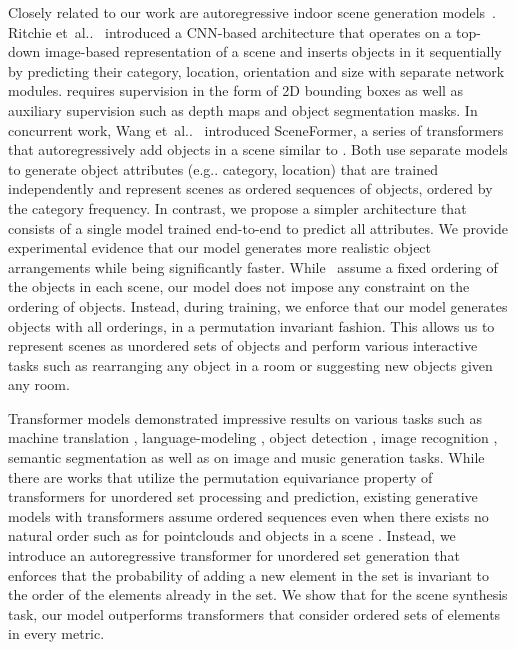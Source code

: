 \documentclass{article}
\makeatletter
\DeclareRobustCommand\onedot{\futurelet\@let@token\@onedot}
\def\@onedot{\ifx\@let@token.\else.\null\fi\xspace}
\def\eg{e.g\onedot} \def\Eg{E.g\onedot}
\def\etal{et~al\onedot}
\newcommand{\boldparagraph}[1]{\vspace{0.2cm}\noindent{\bf #1:} }
\makeatother
\begin{document}
\vspace{-2mm}
\boldparagraph{Autoregressive Scene Synthesis}Closely related to our work are autoregressive indoor scene generation
models~\cite{Wang2018SIGGRAPH, Ritchie2019CVPR, Wang2020ARXIV}. Ritchie
\etal~\cite{Ritchie2019CVPR} introduced a CNN-based architecture that operates
on a top-down image-based representation of a scene and inserts objects in it
sequentially by predicting their category, location, orientation and size with
separate network modules. \cite{Ritchie2019CVPR} requires supervision in the
form of 2D bounding boxes as well as auxiliary supervision such as depth maps
and object segmentation masks.  In concurrent work, Wang
\etal~\cite{Wang2020ARXIV} introduced SceneFormer, a series of transformers
that autoregressively add objects in a scene similar to
\cite{Ritchie2019CVPR}. Both \cite{Ritchie2019CVPR, Wang2020ARXIV}
use separate models to generate object attributes (\eg category, location) that are trained independently and represent
scenes as ordered sequences of objects, ordered by the category frequency.  In
contrast, we propose a simpler architecture that consists of a single model
trained end-to-end to predict all attributes. We provide experimental
evidence that our model generates more realistic object arrangements while being significantly faster. While~\cite{Ritchie2019CVPR, Wang2020ARXIV} assume a fixed ordering
of the objects in each scene, our model does not impose any
constraint on the ordering of objects. Instead, during training,
we enforce that our model generates objects with all orderings, in a
permutation invariant fashion.  This allows us to represent scenes as unordered
sets of objects and perform various interactive tasks such as rearranging any
object in a room or suggesting new objects given any room.

\vspace{-2mm}
\boldparagraph{Transformers for Set Generation}Transformer models \cite{Vaswani2017NIPS} demonstrated impressive results on
various tasks such as machine translation \cite{Shaw2018NAACL, Ott2018WMT},
language-modeling \cite{Brown2020NeurIPS, Devlin2019NAACL}, object detection
\cite{Li2020IROS, Carion2020ECCV, Zhu2021ICLR}, image recognition
\cite{Dosovitskiy2021ICLR, Touvron2020ARIV}, semantic segmentation
\cite{Ye2019CVPR} as well as on image \cite{Parmar2018ICML,
Katharopoulos2020ICML, Chen2020ICML, Esser2021CVPR, Tulsiani2021ICML} and
music \cite{Dhariwal2020ARXIV} generation tasks. While there are works
\cite{Lee2019ICML, Kosiorek2020ARXIV} that utilize the permutation equivariance property of
transformers for unordered set processing and prediction, existing generative
models with transformers assume ordered sequences \cite{Brown2020NeurIPS,
Chen2020ICML, Child2019ARXIV} even when there exists no natural order such as
for pointclouds \cite{Nash2020ICML} and objects in a scene
\cite{Wang2020ARXIV}. Instead, we introduce an autoregressive transformer for
unordered set generation that enforces that the probability of adding a new element
in the set is invariant to the order of the elements already in the set. We
show that for the scene synthesis task, our model outperforms
transformers that consider ordered sets of elements in
every metric.
\end{document}
